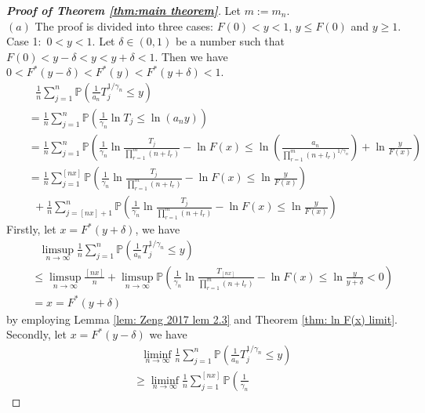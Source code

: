 \documentclass[12pt]{article}
\theoremstyle{plain}
\theoremstyle{definition}
\theoremstyle{remark}
\begin{document}
\begin{proof}[\textit{\textbf{Proof of Theorem \ref{thm:main theorem}}}]
Let $m:=m_n$. \\
$(a)$ The proof is divided into three cases: $F(0)<y<1$, $y\leq F(0)$ and $y\geq 1$.\\
Case 1:\ $0<y<1$. Let $\delta \in(0,1)$ be a number such that $F(0)<y-\delta<y<y+\delta<1$. Then we have $0<F^{*}(y-\delta)<F^{*}(y)<F^{*}(y+\delta)<1$.
\begin{eqnarray*}
&&\ \ \     \frac{1}{n} \sum_{j=1}^{n} \mathbb{P}\left(\frac{1}{a_n}T_j^{1 / \gamma_{n}} \leq y\right)\\
&&=\frac{1}{n} \sum_{j=1}^{n} \mathbb{P}\left(\frac{1}{\gamma_{n}}\ln T_{j} \leq  \ln (a_n y)\right)\\
&&=\frac{1}{n} \sum_{j=1}^{n} \mathbb{P}\left(\frac{1}{\gamma_{n}}
\ln \frac{T_{j}}{\prod_{r=1}^{m}\left(n+l_{r}\right)}-\ln F(x)
\leq  \ln ( \frac{a_n}{\prod_{r=1}^{m}(n+l_r)^{1/\gamma_{n}}})+\ln \frac{y}{F(x)}   \right)\\
&&=\frac{1}{n} \sum_{j=1}^{[nx]} \mathbb{P}\left(\frac{1}{\gamma_{n}}
\ln \frac{T_{j}}{\prod_{r=1}^{m}\left(n+l_{r}\right)}-\ln F(x)
\leq  \ln \frac{y}{F(x)}   \right)\\
&&\ \ +\frac{1}{n} \sum_{j=[nx]+1}^{n} \mathbb{P}\left(\frac{1}{\gamma_{n}}
\ln \frac{T_{j}}{\prod_{r=1}^{m}\left(n+l_{r}\right)}-\ln F(x)
\leq  \ln \frac{y}{F(x)}   \right)
\end{eqnarray*}
Firstly, let $x=F^{*}(y+\delta)$, we have
\begin{eqnarray*}
&&\ \ \  \limsup _{n \rightarrow \infty}   \frac{1}{n} \sum_{j=1}^{n} \mathbb{P}\left(\frac{1}{a_n}T_j^{1 / \gamma_{n}} \leq y\right)\\
&&\leq \limsup _{n \rightarrow \infty}  \frac{[nx]}{n}+ \limsup _{n \rightarrow \infty}  \mathbb{P}\left(\frac{1}{\gamma_{n}}
\ln \frac{T_{[nx]}}{\prod_{r=1}^{m}\left(n+l_{r}\right)}-\ln F(x)
\leq  \ln \frac{y}{y+\delta}<0   \right)\\
&&=x=F^{*}(y+\delta)
\end{eqnarray*}
by employing Lemma \ref{lem: Zeng 2017   lem 2.3} and Theorem \ref{thm: ln F(x) limit}.\\
Secondly, let $x=F^{*}(y-\delta)$  we have
\begin{eqnarray*}
    &&\ \ \  \liminf _{n \rightarrow \infty}   \frac{1}{n} \sum_{j=1}^{n} \mathbb{P}\left(\frac{1}{a_n}T_j^{1 / \gamma_{n}} \leq y\right)\\
    &&\geq \liminf _{n \rightarrow \infty}  \frac{1}{n} \sum_{j=1}^{[nx]} \mathbb{P}\left(\frac{1}{\gamma_{n}}

\end{eqnarray*}
\end{proof}
\end{document}

